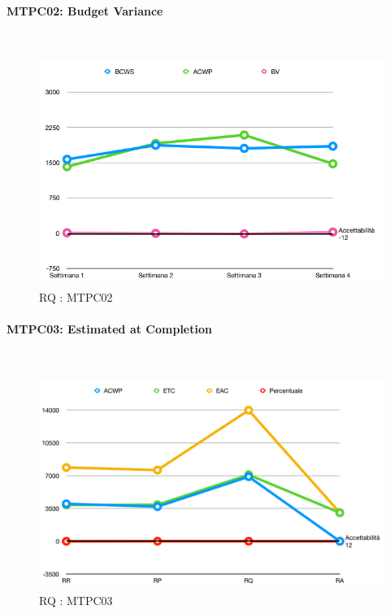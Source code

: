 \paragraph{MTPC02: Budget Variance}\-\\
\begin{figure}[H]
	\begin{center}
		\includegraphics[scale=0.5]{./images/grafici_RQ/MTPC02.png} 
	\end{center}
	\caption{RQ : MTPC02}
\end{figure}

\pagebreak

\paragraph{MTPC03: Estimated at Completion}\-\\
\begin{figure}[H]
	\begin{center}
		\includegraphics[scale=0.5]{./images/grafici_RQ/MTPC03.png} 
	\end{center}
	\caption{RQ : MTPC03}
\end{figure}

